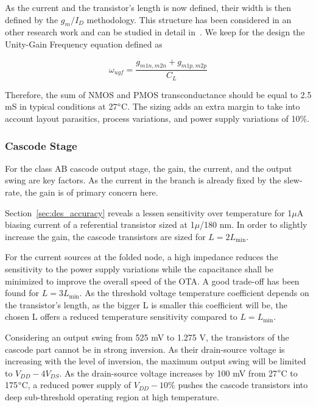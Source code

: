 As the current and the transistor's length is now defined, their width is then defined by the \(g_m/I_D \) methodology. This structure has been considered in an other research work and can be studied in detail in~\cite{Vallee1994,Lipka2009,Hati2012}. We keep for the design the Unity-Gain Frequency equation defined as

\begin{equation}
\omega_{ugf} = \frac{g_{m1n,m2n} + g_{m1p,m2p}}{C_L}
\end{equation}

Therefore, the sum of NMOS and PMOS transconductance should be equal to 2.5 mS in typical conditions at 27\(\degree \)C. The sizing adds an extra margin to take into account layout parasitics, process variations, and power supply variations of 10\%.

\subsubsection{Cascode Stage}
For the class AB cascode output stage, the gain, the current, and the output swing are key factors. As the current in the branch is already fixed by the slew-rate, the gain is of primary concern here.

Section~\ref{sec:des_accuracy} reveals a lessen sensitivity over temperature for 1\(\mu \)A biasing current of a referential transistor sized at 1\(\mu \)/180 nm. In order to slightly increase the gain, the cascode transistors are sized for \(L = 2 L_{\min} \).

For the current sources at the folded node, a high impedance reduces the sensitivity to the power supply variations while the capacitance shall be minimized to improve the overall speed of the OTA\@. A good trade-off has been found for \(L = 3 L_{\min} \). As the threshold voltage temperature coefficient depends on the transistor's length, as the bigger L is smaller this coefficient will be, the chosen L offers a reduced temperature sensitivity compared to \(L = L_{\min} \).

Considering an output swing from 525 mV to 1.275 V, the transistors of the cascode part cannot be in strong inversion. As their drain-source voltage is increasing with the level of inversion, the maximum output swing will be limited to \(V_{DD} - 4 V_{DS} \). As the drain-source voltage increases by 100 mV from 27\(\degree \)C to 175\(\degree \)C, a reduced power supply of \(V_{DD} - 10\% \) pushes the cascode transistors into deep sub-threshold operating region at high temperature.

